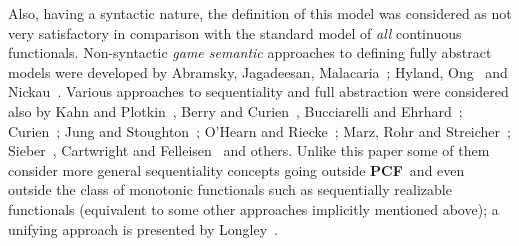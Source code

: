 \documentclass[fleqn]{LMCS}
\theoremstyle{plain}\newtheorem{satz}[thm]{Satz}
\theoremstyle{plain}\newtheorem{hyp}[thm]{Hypothesis}
\theoremstyle{plain}\newtheorem{hyps}[thm]{Hypotheses}
\theoremstyle{definition}\newtheorem{note}[thm]{Note}
\newcommand{\PCF}{\mbox{\bf PCF}}
\newcommand{\?}{\mbox{?}}
\begin{document}
Also, having a syntactic nature, 
the definition of this model was considered as 
not very satisfactory 
in comparison with the standard model of \emph{all} continuous functionals. 
Non-syntactic
\emph{game semantic} approaches 
to defining fully abstract models 
were developed by  
Abramsky, Jagadeesan, Malacaria~\cite{Abramsky-Jagadeesan2000}; 
Hyland, Ong~\cite{Hyland-Ong2000} and Nickau~\cite{Nickau96}.  
Various approaches to sequentiality and full abstraction were considered also 
by 
Kahn and Plotkin~\cite{KP93},  
Berry and Curien~\cite{BC82}, 
Bucciarelli and 
Ehrhard~\cite{BE91,BE93}; Curien~\cite{Cur92}; 
Jung and Stoughton~\cite{Jung-Stoughton93}; 
O'Hearn and Riecke~\cite{OR95}; 
Marz, Rohr and Streicher~\cite{Marz-Thesis,Marz-Rohr-Streicher}; 
Sieber~\cite{Sieber92}, 
Cartwright and Felleisen~\cite{Cartw-Fell92}
and others. Unlike this paper some of them consider more general sequentiality concepts 
going outside \PCF\ and even outside the class 
of monotonic functionals 
such as sequentially realizable functionals (equivalent to some other 
approaches implicitly mentioned above); a unifying approach is presented by 
Longley~\cite{Longley-seq-realizable}.
\end{document}
